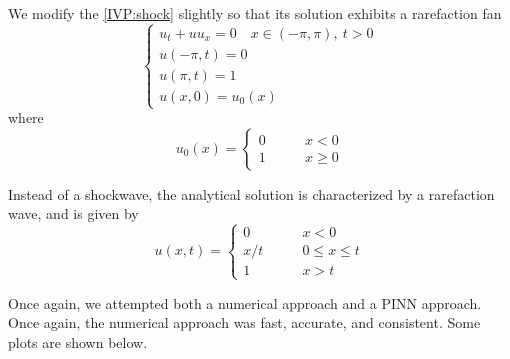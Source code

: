 \documentclass{myproject}
\begin{document}
We modify the \eqref{IVP:shock} slightly so that its solution exhibits a rarefaction fan
\begin{equation}\label{IVP:shock}
    \begin{cases}
        u_t + uu_x = 0 \quad x \in (-\pi,\pi), \: t > 0 \\
        u(-\pi,t) = 0 \\
        u(\pi,t) = 1 \\
        u(x,0) = u_0(x)
    \end{cases} 
\end{equation}
where 
\begin{equation}
    u_0(x) = \begin{cases}
        0 \qquad & x < 0 \\
        1 \qquad & x \geq 0
    \end{cases}
\end{equation}

Instead of a shockwave, the analytical solution is characterized by a rarefaction wave, and is given by
\begin{equation}
    u(x,t) = \begin{cases}
        0 \qquad & x < 0 \\
        x/t \qquad & 0 \leq x \leq t \\
        1 \qquad & x > t
    \end{cases}
\end{equation}

Once again, we attempted both a numerical approach and a PINN approach. Once again, the numerical approach was fast, accurate, and consistent. Some plots are shown below.
\end{document}
